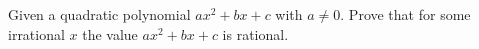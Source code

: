 \problem
Given a quadratic polynomial $a x^2 + b x + c$ with $a \neq 0$.
Prove that for some irrational $x$ the value $a x ^ 2 + b x + c$ is
rational.

\solution

\endproblem
